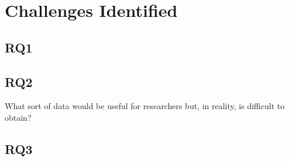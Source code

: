 \section{Challenges Identified}\label{sec:ind_challenges}

\subsection{RQ1}

\subsection{RQ2}

What sort of data would be useful for researchers but, in reality, is difficult to obtain?

\subsection{RQ3}
